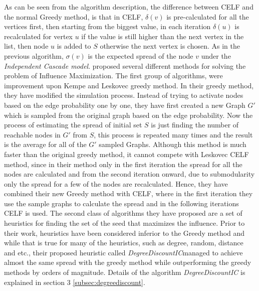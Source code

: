 \documentclass[english]{tktltiki}
\begin{document}
As can be seen from the algorithm description, the difference between CELF and the normal Greedy method, is that in CELF, $\delta(v)$ is pre-calculated for all the vertices first, then starting from the biggest value, in each iteration $\delta(u)$ is recalculated for vertex $u$ if the value is still higher than the next vertex in the list, then node $u$ is added to $S$ otherwise the next vertex is chosen. As in the previous algorithm, $\sigma(v)$ is the expected spread of the node $v$ under the \textit{Independent Cascade model}.
\cite{chen09}proposed several different methods for solving the problem of Influence Maximization. The first group of algorithms, were improvement upon Kempe \cite{kempe03} and Leskovec \cite{leskovec07} greedy method. In their greedy method, they have modified the simulation process. Instead of trying to activate nodes based on the edge probability one by one, they have first created a new Graph $G'$ which is sampled from the original graph based on the edge probability. Now the process of estimating the spread of initial set $S$ is just finding the number of reachable nodes in $G'$ from $S$, this process is repeated many times and the result is the average for all of the $G'$ sampled Graphs. Although this method is much faster than the original greedy method, it cannot compete with Leskovec \cite{leskovec07} CELF method, since in their method only in the first iteration the spread for all the nodes are calculated and from the second iteration onward, due to submodularity only the spread for a few of the nodes are recalculated. Hence, they have combined their new Greedy method with CELF, where in the first iteration they use the sample graphs to calculate the spread and in the following iterations CELF is used. The second class of algorithms they have proposed are a set of heuristics for finding the set of the seed that maximizes the influence. Prior to their work, heuristics have been considered inferior to the Greedy method and while that is true for many of the heuristics, such as degree, random, distance and etc., their proposed heuristic called \textit{DegreeDiscountIC}managed to achieve almost the same spread with the greedy method while outperforming the greedy methods by orders of magnitude. Details of the algorithm \textit{DegreeDiscountIC} is explained in section 3 \ref{subsec:degreediscount}.
\end{document}

